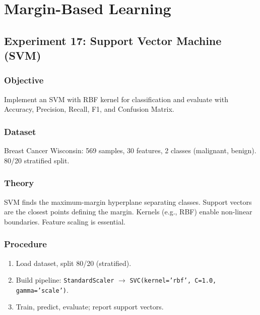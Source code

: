 \documentclass[a4paper,10pt]{article}
\begin{document}
\section{Margin-Based Learning}

\subsection{Experiment 17: Support Vector Machine (SVM)}

\subsubsection{Objective}
Implement an SVM with RBF kernel for classification and evaluate with Accuracy, Precision, Recall, F1, and Confusion Matrix.

\subsubsection{Dataset}
Breast Cancer Wisconsin: 569 samples, 30 features, 2 classes (malignant, benign). 80/20 stratified split.

\subsubsection{Theory}
SVM finds the maximum-margin hyperplane separating classes. Support vectors are the closest points defining the margin. Kernels (e.g., RBF) enable non-linear boundaries. Feature scaling is essential.

\subsubsection{Procedure}
\begin{enumerate}[nosep]
    \item Load dataset, split 80/20 (stratified).
    \item Build pipeline: \texttt{StandardScaler} \(\rightarrow\) \texttt{SVC(kernel='rbf', C=1.0, gamma='scale')}.
    \item Train, predict, evaluate; report support vectors.
\end{enumerate}
\end{document}
